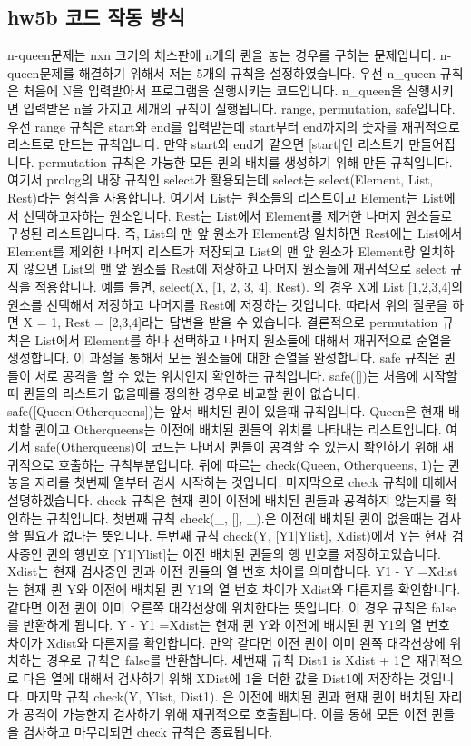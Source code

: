 \documentclass{article}
\begin{document}
\subsection{hw5b 코드 작동 방식}
n-queen문제는 nxn 크기의 체스판에 n개의 퀸을 놓는 경우를 구하는 문제입니다. n-queen문제를 해결하기 위해서 저는 5개의 규칙을 설정하였습니다. 우선 n\_queen 규칙은 처음에 N을 입력받아서 프로그램을 실행시키는 코드입니다. n\_queen을 실행시키면 입력받은 n을 가지고 세개의 규칙이 실행됩니다. range, permutation, safe입니다. 우선 range 규칙은 start와 end를 입력받는데 start부터 end까지의 숫자를 재귀적으로 리스트로 만드는 규칙입니다. 만약 start와 end가 같으면 [start]인 리스트가 만들어집니다. permutation 규칙은 가능한 모든 퀸의 배치를 생성하기 위해 만든 규칙입니다. 여기서 prolog의 내장 규칙인 select가 활용되는데 select는 select(Element, List, Rest)라는 형식을 사용합니다.
여기서 List는 원소들의 리스트이고 Element는 List에서 선택하고자하는 원소입니다. Rest는 List에서 Element를 제거한 나머지 원소들로 구성된 리스트입니다. 즉, List의 맨 앞 원소가 Element랑 일치하면 Rest에는 List에서 Element를 제외한 나머지 리스트가 저장되고 List의 맨 앞 원소가 Element랑 일치하지 않으면 List의 맨 앞 원소를 Rest에 저장하고 나머지 원소들에 재귀적으로 select 규칙을 적용합니다. 예를 들면, select(X, [1, 2, 3, 4], Rest). 의 경우 X에 List [1,2,3,4]의 원소를 선택해서 저장하고 나머지를 Rest에 저장하는 것입니다. 따라서 위의 질문을 하면 X = 1, Rest = [2,3,4]라는 답변을 받을 수 있습니다. 결론적으로 permutation 규칙은 List에서 Element를 하나 선택하고 나머지 원소들에 대해서 재귀적으로 순열을 생성합니다. 이 과정을 통해서 모든 원소들에 대한 순열을 완성합니다. safe 규칙은 퀸들이 서로 공격을 할 수 있는 위치인지 확인하는 규칙입니다. safe([])는 처음에 시작할때 퀸들의 리스트가 없을때를 정의한 경우로 비교할 퀸이 없습니다. safe([Queen|Otherqueens])는 앞서 배치된 퀸이 있을때 규칙입니다. Queen은 현재 배치할 퀸이고 Otherqueens는 이전에 배치된 퀸들의 위치를 나타내는 리스트입니다. 여기서 safe(Otherqueens)이 코드는 나머지 퀸들이 공격할 수 있는지 확인하기 위해 재귀적으로 호출하는 규칙부분입니다. 뒤에 따르는 check(Queen, Otherqueens, 1)는 퀸 놓을 자리를 첫번째 열부터 검사 시작하는 것입니다. 마지막으로 check 규칙에 대해서 설명하겠습니다. check 규칙은 현재 퀸이 이전에 배치된 퀸들과 공격하지 않는지를 확인하는 규칙입니다. 첫번째 규칙 check(\_, [], \_).은 이전에 배치된 퀸이 없을때는 검사할 필요가 없다는 뜻입니다. 두번째 규칙 check(Y, [Y1|Ylist], Xdist)에서 Y는 현재 검사중인 퀸의 행번호 [Y1|Ylist]는 이전 배치된 퀸들의 행 번호를 저장하고있습니다. Xdist는 현재 검사중인 퀸과 이전 퀸들의 열 번호 차이를 의미합니다. Y1 - Y =\= Xdist 는 현재 퀸 Y와 이전에 배치된 퀸 Y1의 열 번호 차이가 Xdist와 다른지를 확인합니다. 같다면 이전 퀸이 이미 오른쪽 대각선상에 위치한다는 뜻입니다. 이 경우 규칙은 false를 반환하게 됩니다. Y - Y1 =\= Xdist는 현재 퀸 Y와 이전에 배치된 퀸 Y1의 열 번호 차이가 Xdist와 다른지를 확인합니다. 만약 같다면 이전 퀸이 이미 왼쪽 대각선상에 위치하는 경우로 규칙은 false를 반환합니다. 세번째 규칙 Dist1 is Xdist + 1은 재귀적으로 다음 열에 대해서 검사하기 위해 XDist에 1을 더한 값을 Dist1에 저장하는 것입니다. 마지막 규칙 check(Y, Ylist, Dist1). 은 이전에 배치된 퀸과 현재 퀸이 배치된 자리가 공격이 가능한지 검사하기 위해 재귀적으로 호출됩니다. 이를 통해 모든 이전 퀸들을 검사하고 마무리되면 check 규칙은 종료됩니다.
\end{document}
